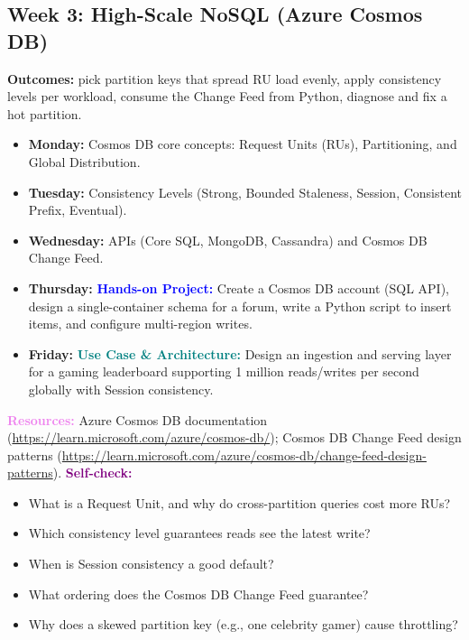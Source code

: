 \documentclass[11pt, a4paper]{article}
\newcommand{\project}[1]{\vspace{1mm}\noindent\textbf{\textcolor{blue}{Hands-on Project:}} #1}
\newcommand{\usecase}[1]{\vspace{1mm}\noindent\textbf{\textcolor{teal}{Use Case \& Architecture:}} #1}
\newcommand{\dayitem}[2]{\item \textbf{#1:} #2}
\newcommand{\resources}[1]{\vspace{1mm}\noindent\textbf{\textcolor{violet}{Resources:}} #1}
\newcommand{\selfcheck}[1]{\vspace{1mm}\noindent\textbf{\textcolor{purple}{Self-check:}} #1}
\begin{document}
\subsection*{Week 3: High-Scale NoSQL (Azure Cosmos DB)}
\par\noindent\textbf{Outcomes:} pick partition keys that spread RU load evenly, apply consistency levels per workload, consume the Change Feed from Python, diagnose and fix a hot partition.
\begin{itemize}[label=-]
    \dayitem{Monday}{Cosmos DB core concepts: Request Units (RUs), Partitioning, and Global Distribution.}
    \dayitem{Tuesday}{Consistency Levels (Strong, Bounded Staleness, Session, Consistent Prefix, Eventual).}
    \dayitem{Wednesday}{APIs (Core SQL, MongoDB, Cassandra) and Cosmos DB Change Feed.}
    \dayitem{Thursday}{\project{Create a Cosmos DB account (SQL API), design a single-container schema for a forum, write a Python script to insert items, and configure multi-region writes.}}
    \dayitem{Friday}{\usecase{Design an ingestion and serving layer for a gaming leaderboard supporting 1 million reads/writes per second globally with Session consistency.}}
\end{itemize}
\resources{Azure Cosmos DB documentation (\url{https://learn.microsoft.com/azure/cosmos-db/}); Cosmos DB Change Feed design patterns (\url{https://learn.microsoft.com/azure/cosmos-db/change-feed-design-patterns}).}
\selfcheck{\begin{itemize}[label=-, itemsep=0pt]
    \item What is a Request Unit, and why do cross-partition queries cost more RUs?
    \item Which consistency level guarantees reads see the latest write?
    \item When is Session consistency a good default?
    \item What ordering does the Cosmos DB Change Feed guarantee?
    \item Why does a skewed partition key (e.g., one celebrity gamer) cause throttling?
\end{itemize}}
\end{document}
